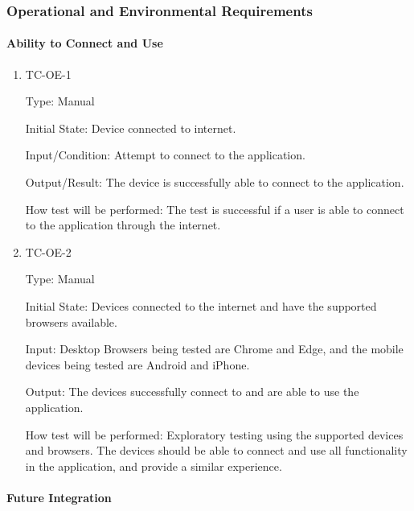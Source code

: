 \documentclass[12pt, titlepage]{article}
\begin{document}
\subsubsection{Operational and Environmental Requirements}

\paragraph{Ability to Connect and Use}

\begin{enumerate}

  \item{TC-OE-1\\}

    Type: Manual

    Initial State: Device connected to internet.

    Input/Condition: Attempt to connect to the application.

    Output/Result: The device is successfully able to connect to the application.

    How test will be performed: The test is successful if a user is able to connect to the application through the internet.

  \item{TC-OE-2\\}

    Type: Manual

    Initial State: Devices connected to the internet and have the
    supported browsers available.

    Input: Desktop Browsers being tested are Chrome and Edge, and the
    mobile devices being tested are Android and iPhone.

    Output: The devices successfully connect to and are able to use
    the application.

    How test will be performed: Exploratory testing using the
    supported devices and browsers. The devices should be able to
    connect and use all functionality in the application, and provide
    a similar experience.

\end{enumerate}

\paragraph{Future Integration}
\end{document}
